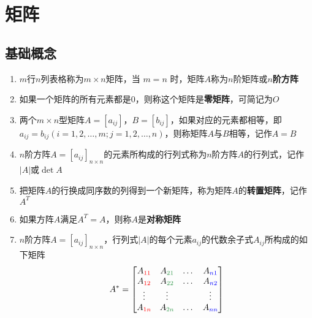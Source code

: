 \documentclass[a4paper,12pt]{article}
\begin{document}


    \section{矩阵}

    \subsection{基础概念}

    \begin{enumerate}
        \item $m$行$n$列表格称为$m \times n$矩阵，当 $m = n$ 时，矩阵$A$称为$n$阶矩阵或\textbf{$n$阶方阵}
        \item 如果一个矩阵的所有元素都是$0$，则称这个矩阵是\textbf{零矩阵}，可简记为$O$
        \item 两个$m \times n$型矩阵$A = [a_{ij}]$，$B = [b_{ij}]$，如果对应的元素都相等，即$a_{ij} = b_{ij}(i = 1,2,\dots,m; j = 1,2,\dots,n)$，则称矩阵$A$与$B$相等，记作$A = B$
        \item $n$阶方阵$A = [a_{ij}]_{n \times n}$的元素所构成的行列式称为$n$阶方阵$A$的行列式，记作$|A|$或$\det A$
        \item 把矩阵$A$的行换成同序数的列得到一个新矩阵，称为矩阵$A$的\textbf{转置矩阵}，记作$A^T$
        \item 如果方阵$A$满足$A^T = A$，则称$A$是\textbf{对称矩阵}
        \item $n$阶方阵$A = [a_{ij}]_{n \times n}$，行列式$|A|$的每个元素$a_{ij}$的代数余子式$A_{ij}$所构成的如下矩阵
        \[
            A^* =
            \begin{bmatrix}
                A_{\color{red}{11}} & A_{\textcolor[rgb]{0.2, 0.6, 0.3}{21}} & \dots & A_{\textcolor{blue}{n1}} \\
                A_{\color{red}{12}} & A_{\textcolor[rgb]{0.2, 0.6, 0.3}{22}} & \dots & A_{\textcolor{blue}{n2}} \\
                \vdots              & \vdots                                 &       & \vdots                   \\
                A_{\color{red}{1n}} & A_{\textcolor[rgb]{0.2, 0.6, 0.3}{2n}} & \dots & A_{\textcolor{blue}{nn}}
            \end{bmatrix}
\]
\end{enumerate}
\end{document}
